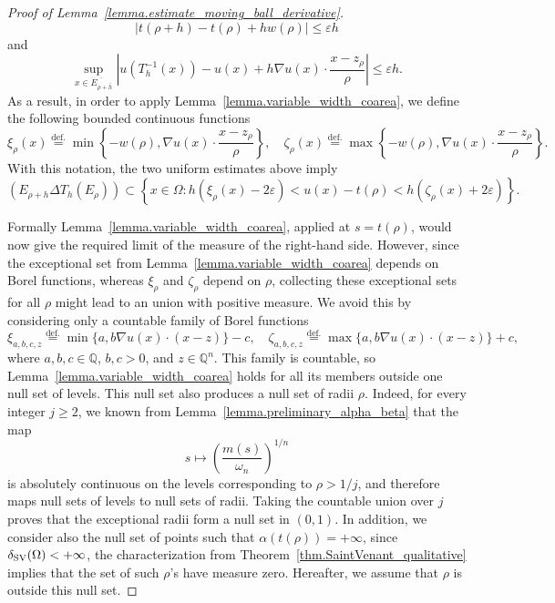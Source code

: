 \documentclass[11pt]{amsart}
\theoremstyle{plain}
\theoremstyle{definition}
\newcommand{\eqdef}{\overset{\text{def.}}{=}}
\begin{document}
\begin{proof}[Proof of Lemma~\ref{lemma.estimate_moving_ball_derivative}]
\[
 \left|t(\rho+h)-t(\rho)+hw(\rho)\right|\le\varepsilon h
\]
and
\[
 \sup_{x\in \overline{E_{\rho + \bar h}}}\left|
 u(T_h^{-1}(x))-u(x)
 +h\nabla u(x)\cdot\frac{x-z_\rho}{\rho}
 \right|\le\varepsilon h.
\]
As a result, in order to apply Lemma~\ref{lemma.variable_width_coarea}, we define the following bounded continuous functions
\[
 \xi_\rho(x)\eqdef
 \min\left\{-w(\rho),\nabla u(x)\cdot\frac{x-z_\rho}{\rho}\right\},
 \quad
 \zeta_\rho(x)\eqdef
 \max\left\{-w(\rho),\nabla u(x)\cdot\frac{x-z_\rho}{\rho}\right\}.
\]
With this notation, the two uniform estimates above imply
\begin{equation}\label{eq.compact_slab_inclusion}
 (E_{\rho+h}\Delta T_h(E_\rho))
 \subset
 \left\{x\in \Omega:
 h(\xi_\rho(x)-2\varepsilon)<u(x)-t(\rho)
 <h(\zeta_\rho(x)+2\varepsilon)\right\}.
\end{equation}

Formally Lemma~\ref{lemma.variable_width_coarea}, applied at $s=t(\rho)$, would now give the required limit of the measure of the right-hand side. However, since the exceptional set from Lemma~\ref{lemma.variable_width_coarea} depends on Borel functions, whereas $\xi_\rho$ and $\zeta_\rho$ depend on $\rho$, collecting these exceptional sets for all $\rho$ might lead to an union with positive measure. We avoid this by considering only a countable family of Borel functions
\[
 \xi_{a,b,c,z} \eqdef 
 \min\{a,b\nabla u(x)\cdot(x-z)\}-c,
 \quad
 \zeta_{a,b,c,z} \eqdef 
 \max\{a,b\nabla u(x)\cdot(x-z)\}+c,
\]
where $a,b,c\in\mathbb Q$, $b,c>0$, and $z\in\mathbb Q^n$. This family is countable, so Lemma~\ref{lemma.variable_width_coarea} holds for all its members outside one null set of levels. This null set also produces a null set of radii $\rho$. Indeed, for every integer $j\ge2$, we known from Lemma~\ref{lemma.preliminary_alpha_beta} that the map
\[
 s\longmapsto\left(\frac{m(s)}{\omega_n}\right)^{1/n}
\]
is absolutely continuous on the levels corresponding to $\rho>1/j$, and therefore maps null sets of levels to null sets of radii. Taking the countable union over $j$ proves that the exceptional radii form a null set in $(0,1)$. In addition, we consider also the null set of points such that $\alpha(t(\rho)) = +\infty$, since $\delta_{\rm SV}(\Omega) < +\infty$, the characterization from Theorem~\ref{thm.SaintVenant_qualitative} implies that the set of such $\rho$'s have measure zero. Hereafter, we assume that $\rho$ is outside this null set. 


\end{proof}
\end{document}
